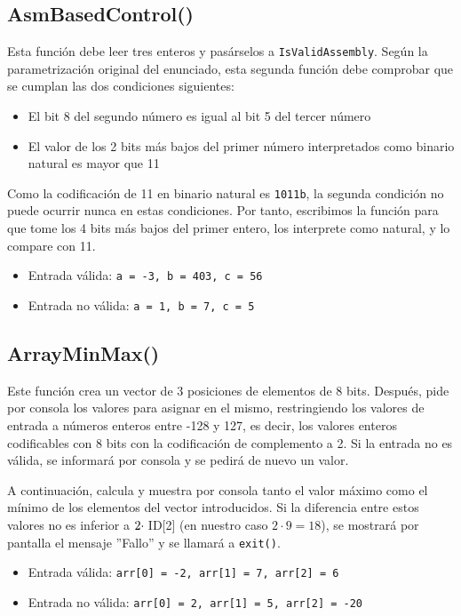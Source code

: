 \documentclass[11pt,a4paper]{article}
\begin{document}
\subsection{AsmBasedControl()}
\hspace{1mm}
Esta función debe leer tres enteros y pasárselos a \texttt{IsValidAssembly}.
Según la parametrización original del enunciado, esta segunda función debe comprobar que se
cumplan las dos condiciones siguientes:
\begin{itemize}
    \item El bit 8 del segundo número es igual al bit 5 del tercer número
    \item El valor de los 2 bits más bajos del primer número interpretados como 
        binario natural es mayor que 11
\end{itemize}
Como la codificación de 11 en binario natural es \texttt{1011b}, la segunda condición no puede
ocurrir nunca en estas condiciones. Por tanto, escribimos la función para que tome los 4 bits
más bajos del primer entero, los interprete como natural, y lo compare con 11.
\begin{itemize}
  \item  Entrada válida: \texttt{a = -3, b = 403,  c = 56}
  \item Entrada no válida: \texttt{a = 1, b = 7, c = 5}
\end{itemize}

\subsection{ArrayMinMax()}
Este función crea un vector de 3 posiciones de elementos de 8 bits. Después, 
pide por consola los valores para asignar en el mismo, restringiendo los valores de entrada a 
números enteros entre -128 y 127, es decir, los valores enteros codificables con 8 bits con la codificación de complemento a 2. 
Si la entrada no es válida, se informará por consola y se pedirá de nuevo un valor. 
\vspace{1ex}

A continuación, calcula y muestra por consola tanto el valor máximo como el mínimo de los elementos del vector introducidos.
 Si la diferencia entre estos valores no es inferior a $2\cdot \hspace{1mm} $ID[2] (en nuestro caso $2 \cdot 9=18$), se mostrará por pantalla el mensaje ''Fallo'' y se llamará a \texttt{exit()}. 
 \begin{itemize}
  \item Entrada válida: \texttt{arr[0] = -2, arr[1] = 7, arr[2] = 6}
  \item Entrada no válida: \texttt{arr[0] = 2, arr[1] = 5, arr[2] = -20}
\end{itemize}
\newpage
\end{document}
